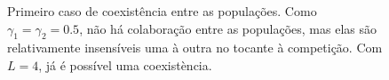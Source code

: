 \documentclass{article}
\begin{document}
	\begin{figure}[h]
		\centering
		\qquad
		\caption{Primeiro caso de coexistência entre as populações. Como $\gamma_1 = \gamma_2 = 0.5$, não há colaboração entre as populações, mas elas são relativamente insensíveis uma à outra no tocante à competição. Com $L = 4$, já é possível uma coexistència.}
		\label{fig:Two-P-08-Coexistence-Time}
	\end{figure}	
	
\end{document}
